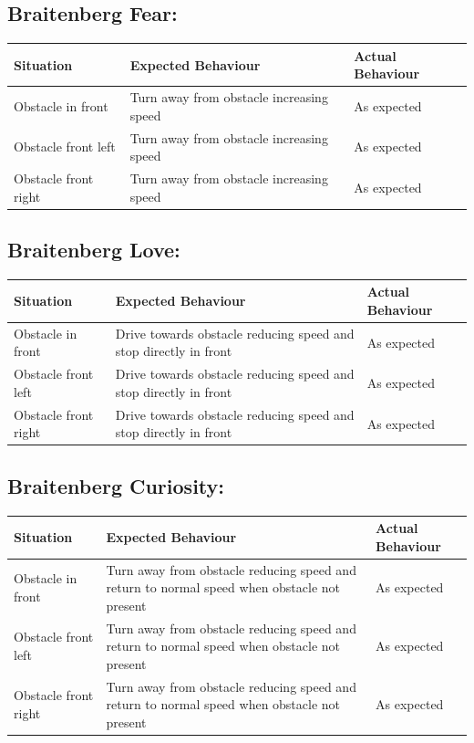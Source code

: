 \documentclass[11pt]{article}
\begin{document}
\subsection*{Braitenberg Fear:}

\begin{center}
\begin{tabular}{ | p{5cm} | p{5cm} | p{5cm} |}
	\hline
	\textbf{Situation} & \textbf{Expected Behaviour} & \textbf{Actual Behaviour} \\
    \hline
	Obstacle in front & Turn away from obstacle increasing speed  & As expected \\
	\hline
	Obstacle front left & Turn away from obstacle increasing speed  & As expected \\
	\hline
	Obstacle front right & Turn away from obstacle increasing speed  & As expected \\
	\hline
\end{tabular}
\end{center}

\subsection*{Braitenberg Love:}

\begin{center}
\begin{tabular}{ | p{5cm} | p{5cm} | p{5cm} |}
	\hline
	\textbf{Situation} & \textbf{Expected Behaviour} & \textbf{Actual Behaviour} \\
    \hline
	Obstacle in front & Drive towards obstacle reducing speed and stop directly in front  & As expected \\
	\hline
	Obstacle front left & Drive towards obstacle reducing speed and stop directly in front  & As expected \\
	\hline
	Obstacle front right & Drive towards obstacle reducing speed and stop directly in front  & As expected \\
	\hline
\end{tabular}
\end{center}

\subsection*{Braitenberg Curiosity:}

\begin{center}
\begin{tabular}{ | p{5cm} | p{5cm} | p{5cm} |}
	\hline
	\textbf{Situation} & \textbf{Expected Behaviour} & \textbf{Actual Behaviour} \\
    \hline
	Obstacle in front & Turn away from obstacle reducing speed and return to normal speed when obstacle not present  & As expected \\
	\hline
	Obstacle front left & Turn away from obstacle reducing speed and return to normal speed when obstacle not present  & As expected \\
	\hline
	Obstacle front right & Turn away from obstacle reducing speed and return to normal speed when obstacle not present  & As expected \\
	\hline
\end{tabular}
\end{center}
\end{document}
